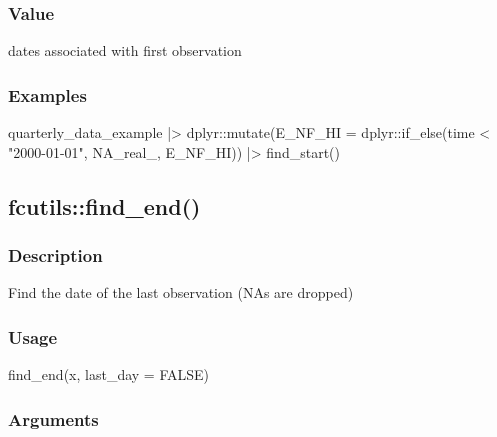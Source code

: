 \documentclass[
  letterpaper,
  DIV=11,
  numbers=noendperiod]{scrreport}
\newenvironment{Shaded}{\begin{snugshade}}{\end{snugshade}}
\newcommand{\AttributeTok}[1]{\textcolor[rgb]{0.40,0.45,0.13}{#1}}
\newcommand{\ConstantTok}[1]{\textcolor[rgb]{0.56,0.35,0.01}{#1}}
\newcommand{\FunctionTok}[1]{\textcolor[rgb]{0.28,0.35,0.67}{#1}}
\newcommand{\NormalTok}[1]{\textcolor[rgb]{0.00,0.23,0.31}{#1}}
\newcommand{\SpecialCharTok}[1]{\textcolor[rgb]{0.37,0.37,0.37}{#1}}
\newcommand{\StringTok}[1]{\textcolor[rgb]{0.13,0.47,0.30}{#1}}
\begin{document}
\subsubsection{Value}\label{value-14}

dates associated with first observation

\subsubsection{Examples}\label{examples-14}

\begin{Shaded}
\begin{Highlighting}[]
\NormalTok{quarterly\_data\_example }\SpecialCharTok{|\textgreater{}}
\NormalTok{  dplyr}\SpecialCharTok{::}\FunctionTok{mutate}\NormalTok{(}\AttributeTok{E\_NF\_HI =}\NormalTok{ dplyr}\SpecialCharTok{::}\FunctionTok{if\_else}\NormalTok{(time }\SpecialCharTok{\textless{}} \StringTok{"2000{-}01{-}01"}\NormalTok{, }\ConstantTok{NA\_real\_}\NormalTok{, E\_NF\_HI)) }\SpecialCharTok{|\textgreater{}}
  \FunctionTok{find\_start}\NormalTok{()}
\end{Highlighting}
\end{Shaded}

\subsection{fcutils::find\_end()}\label{fcutilsfind_end}

\subsubsection{Description}\label{description-15}

Find the date of the last observation (NAs are dropped)

\subsubsection{Usage}\label{usage-15}

\begin{Shaded}
\begin{Highlighting}[]
\FunctionTok{find\_end}\NormalTok{(x, }\AttributeTok{last\_day =} \ConstantTok{FALSE}\NormalTok{)}
\end{Highlighting}
\end{Shaded}

\subsubsection{Arguments}\label{arguments-15}
\end{document}
